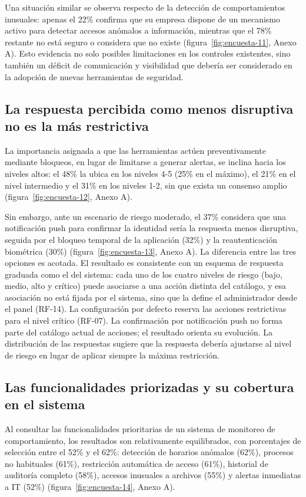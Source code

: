 Una situación similar se observa respecto de la detección de comportamientos inusuales: apenas el 22\% confirma que su empresa dispone de un mecanismo activo para detectar accesos anómalos a información, mientras que el 78\% restante no está seguro o considera que no existe (figura~\ref{fig:encuesta-11}, Anexo A). Esto evidencia no solo posibles limitaciones en los controles existentes, sino también un déficit de comunicación y visibilidad que debería ser considerado en la adopción de nuevas herramientas de seguridad.

\subsection{La respuesta percibida como menos disruptiva no es la más restrictiva}

La importancia asignada a que las herramientas actúen preventivamente mediante bloqueos, en lugar de limitarse a generar alertas, se inclina hacia los niveles altos: el 48\% la ubica en los niveles 4-5 (25\% en el máximo), el 21\% en el nivel intermedio y el 31\% en los niveles 1-2, sin que exista un consenso amplio (figura~\ref{fig:encuesta-12}, Anexo A).

Sin embargo, ante un escenario de riesgo moderado, el 37\% considera que una notificación push para confirmar la identidad sería la respuesta menos disruptiva, seguida por el bloqueo temporal de la aplicación (32\%) y la reautenticación biométrica (30\%) (figura~\ref{fig:encuesta-13}, Anexo A). La diferencia entre las tres opciones es acotada. El resultado es consistente con un esquema de respuesta graduada como el del sistema: cada uno de los cuatro niveles de riesgo (bajo, medio, alto y crítico) puede asociarse a una acción distinta del catálogo, y esa asociación no está fijada por el sistema, sino que la define el administrador desde el panel (RF-14). La configuración por defecto reserva las acciones restrictivas para el nivel crítico (RF-07). La confirmación por notificación push no forma parte del catálogo actual de acciones; el resultado orienta su evolución. La distribución de las respuestas sugiere que la respuesta debería ajustarse al nivel de riesgo en lugar de aplicar siempre la máxima restricción.

\subsection{Las funcionalidades priorizadas y su cobertura en el sistema}

Al consultar las funcionalidades prioritarias de un sistema de monitoreo de comportamiento, los resultados son relativamente equilibrados, con porcentajes de selección entre el 52\% y el 62\%: detección de horarios anómalos (62\%), procesos no habituales (61\%), restricción automática de acceso (61\%), historial de auditoría completo (58\%), accesos inusuales a archivos (55\%) y alertas inmediatas a IT (52\%) (figura~\ref{fig:encuesta-14}, Anexo A).

